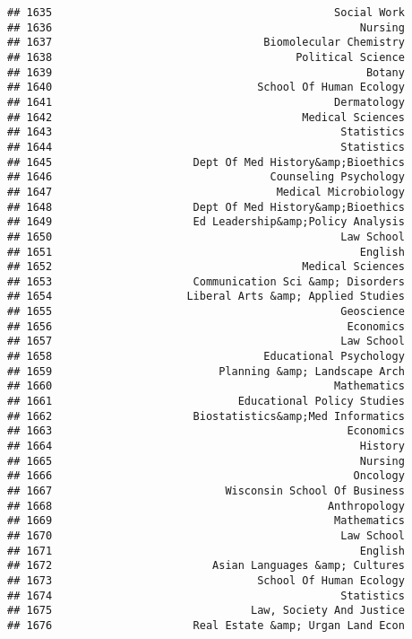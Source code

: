 \documentclass[
]{article}
\begin{document}
\begin{verbatim}
## 1635                                            Social Work
## 1636                                                Nursing
## 1637                                 Biomolecular Chemistry
## 1638                                      Political Science
## 1639                                                 Botany
## 1640                                School Of Human Ecology
## 1641                                            Dermatology
## 1642                                       Medical Sciences
## 1643                                             Statistics
## 1644                                             Statistics
## 1645                      Dept Of Med History&amp;Bioethics
## 1646                                  Counseling Psychology
## 1647                                   Medical Microbiology
## 1648                      Dept Of Med History&amp;Bioethics
## 1649                      Ed Leadership&amp;Policy Analysis
## 1650                                             Law School
## 1651                                                English
## 1652                                       Medical Sciences
## 1653                      Communication Sci &amp; Disorders
## 1654                     Liberal Arts &amp; Applied Studies
## 1655                                             Geoscience
## 1656                                              Economics
## 1657                                             Law School
## 1658                                 Educational Psychology
## 1659                          Planning &amp; Landscape Arch
## 1660                                            Mathematics
## 1661                             Educational Policy Studies
## 1662                      Biostatistics&amp;Med Informatics
## 1663                                              Economics
## 1664                                                History
## 1665                                                Nursing
## 1666                                               Oncology
## 1667                           Wisconsin School Of Business
## 1668                                           Anthropology
## 1669                                            Mathematics
## 1670                                             Law School
## 1671                                                English
## 1672                         Asian Languages &amp; Cultures
## 1673                                School Of Human Ecology
## 1674                                             Statistics
## 1675                               Law, Society And Justice
## 1676                      Real Estate &amp; Urgan Land Econ

\end{verbatim}
\end{document}
